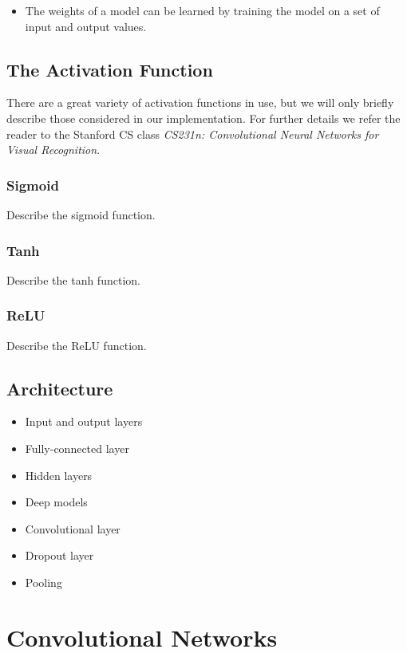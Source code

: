 \begin{itemize}
    \item The weights of a model can be learned by training the model on a set of input and output values.
\end{itemize}

\subsection{The Activation Function}

\noindent There are a great variety of activation functions in use, but we will only briefly describe those considered in our implementation. For further details we refer the reader to the Stanford CS class \textit{CS231n: Convolutional Neural Networks for Visual Recognition}\cite{cs231n_part1}.

\subsubsection{Sigmoid}

Describe the sigmoid function.

\subsubsection{Tanh}

Describe the tanh function.

\subsubsection{ReLU}

Describe the ReLU function.

\subsection{Architecture}

\begin{itemize}
    \item Input and output layers
    \item Fully-connected layer
    \item Hidden layers
    \item Deep models
    \item Convolutional layer
    \item Dropout layer
    \item Pooling
\end{itemize}

\section{Convolutional Networks}

